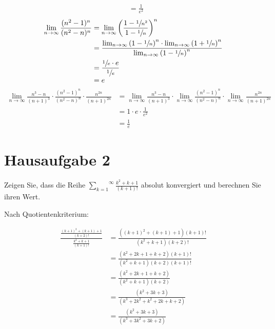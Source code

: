 \documentclass{article}
\begin{document}
\begin{enumerate}[a)]
\begin{align*}
      &= \frac{1}{e^2}
  \end{align*}
  \begin{align*}
    \lim_{n\to\infty} \frac{(n^2-1)^n}{(n^2-n)^n}
    &= \lim_{n\to\infty} \left(\frac{1 -\sfrac{1}{n^2}}{1 - \sfrac{1}{n}}\right)^n \\
    &= \frac{
       \lim_{n\to\infty} \left( 1 - \sfrac{1}{n} \right)^n
       \cdot
       \lim_{n\to\infty} \left( 1 + \sfrac{1}{n} \right)^n
      }{
       \lim_{n\to\infty} \left( 1 - \sfrac{1}{n} \right)^n
      } \\
    &= \frac{\sfrac{1}{e} \cdot e}{\sfrac{1}{e}} \\
    &= e
  \end{align*}
  \begin{align*}
    \lim_{n\to\infty} \frac{n^3 - n}{(n+1)^3} \cdot \frac{(n^2-1)^n}{(n^2-n)^n} \cdot \frac{n^{2n}}{(n+1)^{2n}}
    &= \lim_{n\to\infty} \frac{n^3 - n}{(n+1)^3} \cdot \lim_{n\to\infty} \frac{(n^2-1)^n}{(n^2-n)^n} \cdot \lim_{n\to\infty} \frac{n^{2n}}{(n+1)^{2n}} \\\
    &= 1 \cdot e \cdot \frac{1}{e^2} \\
    &= \frac{1}{e}
  \end{align*}

\end{enumerate}

\section*{Hausaufgabe 2}

Zeigen Sie, dass die Reihe $\overset{\infty}{\underset{k=1}\sum} \frac{k^2+k+1}{(k+1)!}$ absolut konvergiert und berechnen
Sie ihren Wert.

Nach Quotientenkriterium:

\begin{align*}
  \frac{ \frac{(k+1)^2 + (k+1) + 1}{(k+2)!} }{ \frac{k^2 + k + 1}{(k+1)!} }
  &= \frac{ ((k+1)^2 + (k+1) + 1)(k+1)! }{ (k^2 + k + 1) (k+2)! }\\
  &= \frac{ (k^2 + 2k + 1 + k + 2)(k+1)! }{ (k^2 + k + 1) (k+2) (k+1)! }\\
  &= \frac{ (k^2 + 2k + 1 + k + 2) }{ (k^2 + k + 1) (k+2) }\\
  &= \frac{ (k^2 + 3k + 3) }{ (k^3 + 2k^2 + k^2 + 2k + k + 2) }\\
  &= \frac{ (k^2 + 3k + 3) }{ (k^3 + 3k^2 + 3k + 2) }\\
\end{align*}
\end{document}
